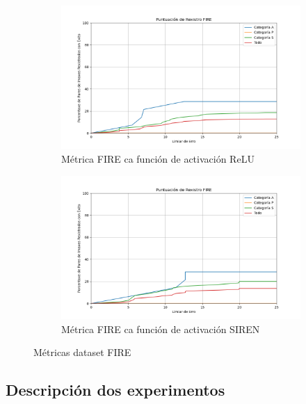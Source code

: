 \begin{figure}[tbp]
    \centering
    \begin{subfigure}[b]{0.5\textwidth}
        \centering
        \includegraphics[width=\textwidth]{imaxes/FIRE_scores/fire_registration_score_ReLU.png}
        \caption{Métrica FIRE ca función de activación ReLU}
        \label{fig:FIRE_relu}
    \end{subfigure}\hfill
    \begin{subfigure}[b]{0.5\textwidth}
        \centering
        \includegraphics[width=\textwidth]{imaxes/FIRE_scores/fire_registration_scores_SIREN.png}
        \caption{Métrica FIRE ca función de activación SIREN}
        \label{fig:FIRE_SIREN}
    \end{subfigure}
    \caption{Métricas dataset FIRE}
    \label{fig:FIRE_scores}
\end{figure}

\subsection{Descripción dos experimentos}
\label{subsec:Descripción dos experimentos}

